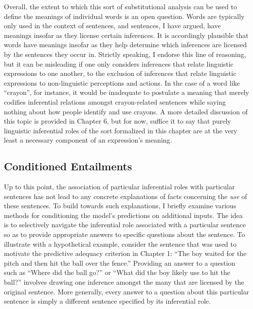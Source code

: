 Overall, the extent to which this sort of substitutional analysis can be used to define the meanings of individual words is an open question. Words are typically only used in the context of sentences, and sentences, I have argued, have meanings insofar as they license certain inferences. It is accordingly plausible that words have meanings insofar as they help determine which inferences are licensed by the sentences they occur in. Strictly speaking, I endorse this line of reasoning, but it can be misleading if one only considers inferences that relate linguistic expressions to one another, to the exclusion of inferences that relate linguistic expressions to non-linguistic perceptions and actions. In the case of a word like ``crayon'', for instance, it would be inadequate to postulate a meaning that merely codifies inferential relations amongst crayon-related sentences while saying nothing about how people identify and use crayons. A more detailed discussion of this topic is provided in Chapter 6, but for now, suffice it to say that purely linguistic inferential roles of the sort formalized in this chapter are at the very least a necessary component of an expression's meaning.

\subsection{Conditioned Entailments}

Up to this point, the association of particular inferential roles with particular sentences has not lead to any concrete explanations of facts concerning the \textit{use} of these sentences. To build towards such explanations, I briefly examine various methods for conditioning the model's predictions on additional inputs. The idea is to selectively navigate the inferential role associated with a particular sentence so as to provide appropriate answers to specific questions about the sentence. To illustrate with a hypothetical example, consider the sentence that was used to motivate the predictive adequacy criterion in Chapter 1: ``The boy waited for the pitch and then hit the ball over the fence.'' Providing an answer to a question such as ``Where did the ball go?'' or ``What did the boy likely use to hit the ball?'' involves drawing one inference amongst the many that are licensed by the original sentence. More generally, every answer to a question about this particular sentence is simply a different sentence specified by its inferential role.

